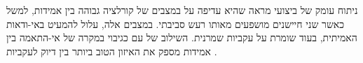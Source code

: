 ניתוח עומק של ביצועי  מראה שהיא עדיפה על  במצבים של קורלציה גבוהה בין אמידות, למשל כאשר שני חיישנים מושפעים מאותו רעש סביבתי. במצבים אלה,  עלול להמעיט באי-ודאות האמיתית, בעוד  שומרת על עקביות שמרנית. השילוב של  עם  כגיבוי במקרה של אי-התאמה בין אמידות מספק את האיזון הטוב ביותר בין דיוק לעקביות \cite{MossEcholocation, Chen2020BioSonar, Thrun2005ProbRobotics, Julier1997CovarianceIntersection, Dissanayake2001SLAM}.